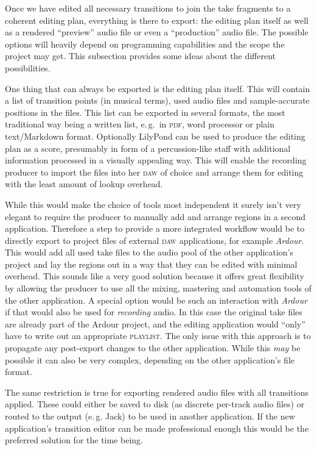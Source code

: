 \documentclass[11pt,a4paper]{article}
\newcommand*{\term}[1]{\textsc{#1}}
\begin{document}
Once we have edited all necessary transitions to join the take fragments to a
coherent editing plan, everything is there to export: the editing plan itself as well
as a rendered “preview” audio file or even a “production” audio file.
The possible options will heavily depend on programming capabilities and the scope
the project may get. This subsection provides some ideas about the different
possibilities.

One thing that can always be exported is the editing plan itself. This will contain
a list of transition points (in musical terms), used audio files and sample-accurate
positions in the files.
This list can be exported in several formats, the most traditional way being a written
list, e.\,g.\ in \textsc{pdf}, word processor or plain text/Markdown format.
Optionally LilyPond can be used to produce the editing plan as a score,
presumably in form of a percussion-like staff with additional information
processed in a visually appealing way.
This will enable the recording producer to import the files into her \textsc{daw} of
choice and arrange them for editing with the least amount of lookup overhead.

While this would make the choice of tools most independent it surely isn't very
elegant to require the producer to manually add and arrange regions in a second
application. Therefore a step to provide a more integrated workflow would be to
directly export to project files of external \textsc{daw} applications, for example
\emph{Ardour}. This would add all used take files to the audio pool of the other
application's project and lay the regions out in a way that they can be edited
with minimal overhead. This sounds like a very good solution because it offers
great flexibility by allowing the producer to use all the mixing, mastering and
automation tools of the other application. 
A special option would be such an interaction with \emph{Ardour} if that would also
be used for \emph{recording} audio. In this case the original take files are
already part of the Ardour project, and the editing application would “only” have
to write out an appropriate \term{playlist}.
The only issue with this approach is to propagate any post-export changes to the
other application. While this \emph{may} be possible it can also be very complex,
depending on the other application's file format.

The same restriction is true for exporting rendered audio files with all transitions
applied. These could either be saved to disk (as discrete per-track audio files) or
routed to the output (e.\,g. Jack) to be used in another application. If the new
application's transition editor can be made professional enough this would be
the preferred solution for the time being.
\end{document}
